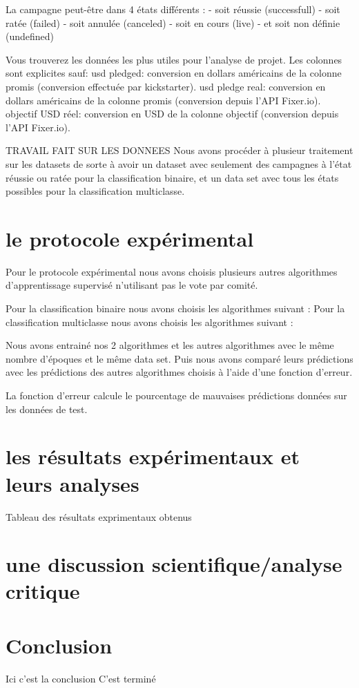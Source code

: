 \documentclass{article}
\begin{document}
La campagne peut-être dans 4 états différents : 
- soit réussie (successfull)
- soit ratée (failed)
- soit annulée (canceled)
- soit en cours (live)
- et soit non définie (undefined)

Vous trouverez les données les plus utiles pour l'analyse de projet. Les colonnes sont explicites sauf:
usd pledged: conversion en dollars américains de la colonne promis (conversion effectuée par kickstarter).
usd pledge real: conversion en dollars américains de la colonne promis (conversion depuis l'API Fixer.io).
objectif USD réel: conversion en USD de la colonne objectif (conversion depuis l'API Fixer.io).

TRAVAIL FAIT SUR LES DONNEES
Nous avons procéder à plusieur traitement sur les datasets de sorte à avoir un dataset avec seulement des campagnes à l'état réussie ou ratée pour la classification binaire, et un data set avec tous les états possibles pour la classification multiclasse. 

\section{le protocole expérimental}
Pour le protocole expérimental nous avons choisis plusieurs autres algorithmes d'apprentissage supervisé n'utilisant pas le vote par comité. 

Pour la classification binaire nous avons choisis les algorithmes suivant : 
Pour la classification multiclasse nous avons choisis les algorithmes suivant : 

Nous avons entrainé nos 2 algorithmes et les autres algorithmes avec le même nombre d'époques et le même data set. 
Puis nous avons comparé leurs prédictions avec les prédictions des autres algorithmes choisis à l'aide d'une fonction d'erreur.

La fonction d'erreur calcule le pourcentage de mauvaises prédictions données sur les données de test. 

\section{les résultats expérimentaux et leurs analyses}
Tableau des résultats exprimentaux obtenus

\section{une discussion scientifique/analyse critique}

\section{Conclusion}
Ici c'est la conclusion 
C'est terminé



\end{document}
